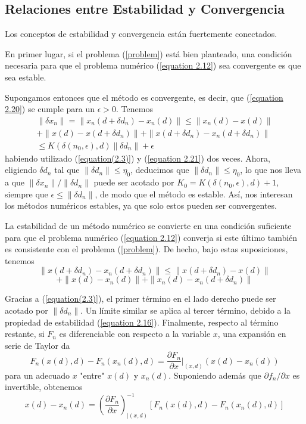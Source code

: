 \subsection{Relaciones entre Estabilidad y Convergencia}
Los conceptos de estabilidad y convergencia están fuertemente conectados.

En primer lugar, si el problema (\ref{problem}) está bien planteado, una condición necesaria para que el problema numérico (\ref{equation 2.12}) sea convergente es que sea estable.

Supongamos entonces que el método es convergente, es decir, que (\ref{equation 2.20}) se cumple para un $\epsilon > 0$. Tenemos
\begin{multline}
    \| \delta x_n \| = \| x_n(d + \delta d_n) - x_n(d) \| \leq \| x_n(d) - x(d) \| \\
    + \| x(d) - x(d + \delta d_n) \| + \| x(d + \delta d_n) - x_n (d + \delta d_n) \| \\
    \leq K(\delta (n_0, \epsilon), d) \| \delta d_n \| + \epsilon
    \label{equation 2.24}
\end{multline}
habiendo utilizado (\ref{equation(2.3)}) y (\ref{equation 2.21}) dos veces. Ahora, eligiendo $\delta d_n$ tal que $\| \delta d_n \| \leq \eta_0$, deducimos que $\| \delta d_n \| \leq \eta_0$, lo que nos lleva a que $\| \delta x_n \| / \| \delta d_n \|$ puede ser acotado por $K_0 = K(\delta (n_0 , \epsilon), d) + 1$, siempre que $\epsilon \leq \| \delta d_n \|$, de modo que el método es estable. Así, nos interesan los métodos numéricos estables, ya que solo estos pueden ser convergentes.

La estabilidad de un método numérico se convierte en una condición suficiente para que el problema numérico (\ref{equation 2.12}) converja si este último también es consistente con el problema (\ref{problem}). De hecho, bajo estas suposiciones, tenemos
\[
\|x(d + \delta d_n) - x_n(d + \delta d_n)\| \leq \| x(d + \delta d_n) - x(d) \|
\]
\[
+ \| x(d) - x_n(d) \| + \| x_n(d) - x_n(d + \delta d_n)\|
\]

Gracias a (\ref{equation(2.3)}), el primer término en el lado derecho puede ser acotado por $\| \delta d_n \|$. Un límite similar se aplica al tercer término, debido a la propiedad de estabilidad (\ref{equation 2.16}). Finalmente, respecto al término restante, si $F_n$ es diferenciable con respecto a la variable $x$, una expansión en serie de Taylor da
\[
F_n(x(d), d) - F_n(x_n(d), d) = \frac{\partial F_n}{\partial x}|_{(x, d)}(x(d) - x_n(d))
\]
para un adecuado $x$ "entre" $x(d)$ y $x_n(d)$. Suponiendo además que $\partial f_n / \partial x$ es invertible, obtenemos
\begin{equation}
    x(d) - x_n(d) = \left( \frac{\partial F_n}{\partial x} \right)^{-1}_{|(x, d)} [F_n(x(d), d) - F_n(x_n(d), d)]
    \label{equation 2.25}
\end{equation}

